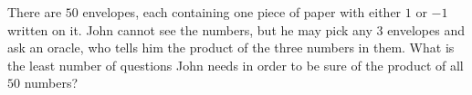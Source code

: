 There are \(50\) envelopes, each containing one piece of paper with either \(1\) or \(-1\) written on it. John cannot see the numbers, but he may pick any \(3\) envelopes and ask an oracle, who tells him the product of the three numbers in them. What is the least number of questions John needs in order to be sure of the product of all \(50\) numbers?
